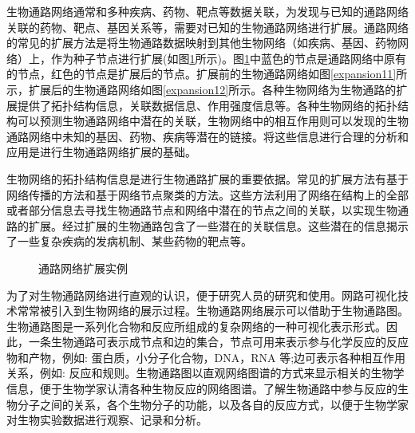 生物通路网络通常和多种疾病、药物、靶点等数据关联，为发现与已知的通路网络关联的药物、靶点、基因关系等，需要对已知的生物通路网络进行扩展。通路网络的常见的扩展方法是将生物通路数据映射到其他生物网络（如疾病、基因、药物网络）上，作为种子节点进行扩展(如图\ref{fig1}所示)。图\ref{fig1}中蓝色的节点是通路网络中原有的节点，红色的节点是扩展后的节点。扩展前的生物通路网络如图\ref{expansion11}所示，扩展后的生物通路网络如图\ref{expansion12}所示。各种生物网络为生物通路的扩展提供了拓扑结构信息，关联数据信息、作用强度信息等。各种生物网络的拓扑结构可以预测生物通路网络中潜在的关联，生物网络中的相互作用则可以发现的生物通路网络中未知的基因、药物、疾病等潜在的链接。将这些信息进行合理的分析和应用是进行生物通路网络扩展的基础。

 生物网络的拓扑结构信息是进行生物通路扩展的重要依据。常见的扩展方法有基于网络传播的方法和基于网络节点聚类的方法。这些方法利用了网络在结构上的全部或者部分信息去寻找生物通路节点和网络中潜在的节点之间的关联，以实现生物通路的扩展。经过扩展的生物通路包含了一些潜在的关联信息。这些潜在的信息揭示了一些复杂疾病的发病机制、某些药物的靶点等。



\begin{figure}{\label{fig1}}
  \centering
  \begin{minipage}{.95\linewidth}
    \setlength{\subfigcapskip}{-1bp}
    \centering
    \begin{minipage}{\textwidth}
      \centering
      \subfigure{\label{expansion11}}\addtocounter{subfigure}{-2}
      \subfigure{\subfigure[扩展前的生物通路网络]{\texttt{[image: 1-a]}}}
      \subfigure{\label{expansion12}}\addtocounter{subfigure}{-2}
      \subfigure{\subfigure[扩展后的生物通路网络]{\texttt{[image: 1-b]}}}
    \end{minipage}
	\caption[fig1]{通路网络扩展实例}
	\label{fig1}
  \end{minipage}
\end{figure}

为了对生物通路网络进行直观的认识，便于研究人员的研究和使用。网路可视化技术常常被引入到生物网络的展示过程。生物通路网络展示可以借助于生物通路图。生物通路图是一系列化合物和反应所组成的复杂网络的一种可视化表示形式。因此，一条生物通路可表示成节点和边的集合，节点可用来表示参与化学反应的反应物和产物，例如: 蛋白质，小分子化合物，DNA，RNA 等;边可表示各种相互作用关系，例如: 反应和规则。生物通路图以直观网络图谱的方式来显示相关的生物学信息，便于生物学家认清各种生物反应的网络图谱。了解生物通路中参与反应的生物分子之间的关系，各个生物分子的功能，以及各自的反应方式，以便于生物学家对生物实验数据进行观察、记录和分析。

